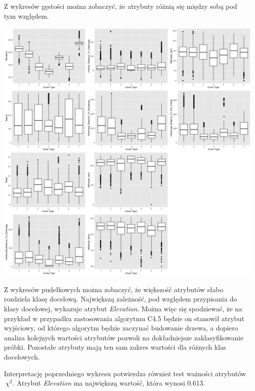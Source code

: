 \documentclass[11pt]{article} %
\begin{document}
Z wykresów gęstości można zobaczyć, że atrybuty różnią się między sobą pod tym względem.

\begin{center}
	\includegraphics[width=16cm]{boxplot-grouped}
\end{center}

Z wykresów pudełkowych można zobaczyć, że większość atrybutów słabo rozdziela klasę docelową. Największą zależność, pod względem przypisania do klasy docelowej, wykazuje atrybut \emph{Elevation}.
Można więc się spodziewać, że na przykład w przypadku zastosowania algorytmu C4.5 będzie on stanowił atrybut wyjściowy, od którego algorytm będzie zaczynać budowanie drzewa, a dopiero analiza kolejnych wartości atrybutów pozwoli na dokładniejsze zaklasyfikowanie próbki. Pozostałe atrybuty mają ten sam zakres wartości dla różnych klas docelowych.

Interpretację poprzedniego wykresu potwierdza również test ważności atrybutów $\ \chi^2 $. Atrybut \emph{Elevation} ma największą wartość, która wynosi 0.613.
\end{document}
